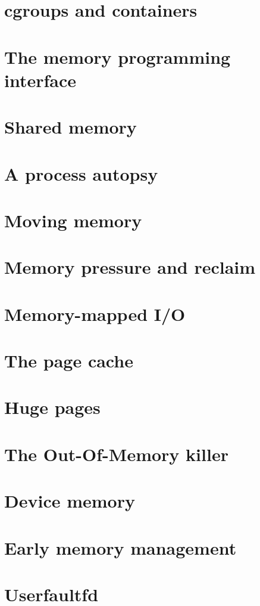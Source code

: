 \documentclass[a4paper,oneside]{scrbook}
\begin{document}
\chapter{cgroups and containers}


\chapter{The memory programming interface}


\chapter{Shared memory}


\chapter{A process autopsy}


\chapter{Moving memory}


\chapter{Memory pressure and reclaim}


\chapter{Memory-mapped I/O}


\chapter{The page cache}


\chapter{Huge pages}


\chapter{The Out-Of-Memory killer}


\chapter{Device memory}


\chapter{Early memory management}

\chapter{Userfaultfd}


\backmatter
\nocite{*}
\printbibliography
\printindex
\end{document}
